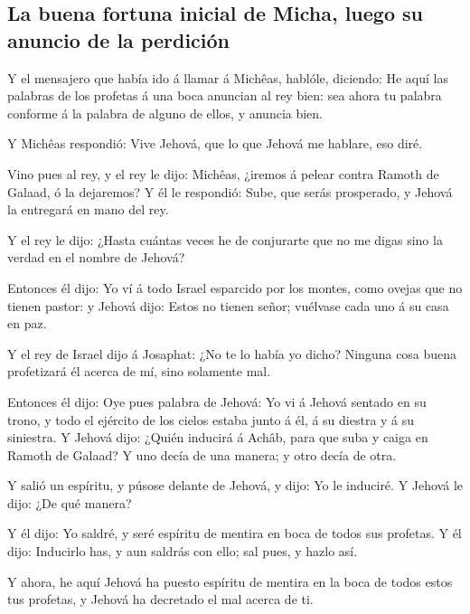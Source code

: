 \hypertarget{la-buena-fortuna-inicial-de-micha-luego-su-anuncio-de-la-perdiciuxf3n}{%
\subsection{La buena fortuna inicial de Micha, luego su anuncio de la
perdición}\label{la-buena-fortuna-inicial-de-micha-luego-su-anuncio-de-la-perdiciuxf3n}}

 Y el mensajero que había ido á llamar á Michêas,
hablóle, diciendo: He aquí las palabras de los profetas á una boca
anuncian al rey bien: sea ahora tu palabra conforme á la palabra de
alguno de ellos, y anuncia bien.

 Y Michêas respondió: Vive Jehová, que lo que Jehová me
hablare, eso diré.

 Vino pues al rey, y el rey le dijo: Michêas, ¿iremos á
pelear contra Ramoth de Galaad, ó la dejaremos? Y él le respondió: Sube,
que serás prosperado, y Jehová la entregará en mano del rey.

 Y el rey le dijo: ¿Hasta cuántas veces he de conjurarte
que no me digas sino la verdad en el nombre de Jehová?

 Entonces él dijo: Yo ví á todo Israel esparcido por los
montes, como ovejas que no tienen pastor: y Jehová dijo: Estos no tienen
señor; vuélvase cada uno á su casa en paz.

 Y el rey de Israel dijo á Josaphat: ¿No te lo había yo
dicho? Ninguna cosa buena profetizará él acerca de mí, sino solamente
mal.

 Entonces él dijo: Oye pues palabra de Jehová: Yo vi á
Jehová sentado en su trono, y todo el ejército de los cielos estaba
junto á él, á su diestra y á su siniestra.  Y Jehová
dijo: ¿Quién inducirá á Achâb, para que suba y caiga en Ramoth de
Galaad? Y uno decía de una manera; y otro decía de otra.

 Y salió un espíritu, y púsose delante de Jehová, y dijo:
Yo le induciré. Y Jehová le dijo: ¿De qué manera?

 Y él dijo: Yo saldré, y seré espíritu de mentira en boca
de todos sus profetas. Y él dijo: Inducirlo has, y aun saldrás con ello;
sal pues, y hazlo así.

 Y ahora, he aquí Jehová ha puesto espíritu de mentira en
la boca de todos estos tus profetas, y Jehová ha decretado el mal acerca
de ti.

